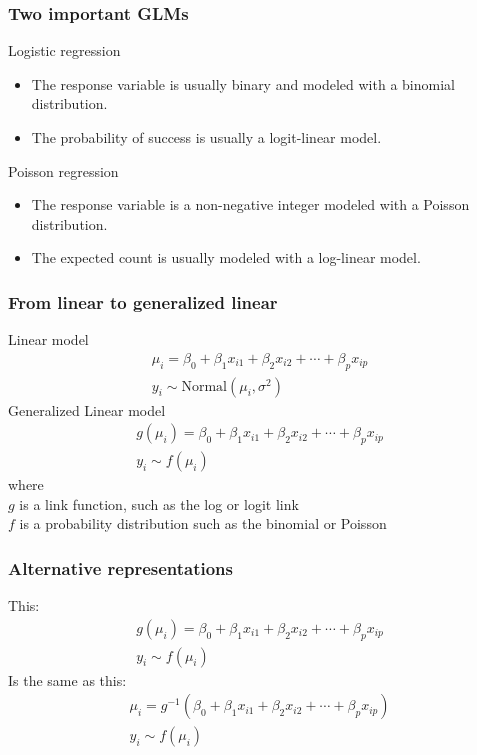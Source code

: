 \documentclass[color=usenames,dvipsnames]{beamer}\usepackage[]{graphicx}\usepackage[]{color}
\begin{document}
\begin{frame}
  \frametitle{Two important GLMs}
  {Logistic regression \\}
  \begin{itemize}
    \item The response variable is usually binary and modeled with a
      binomial distribution.
    \item The probability of success is usually a logit-linear
      model.
  \end{itemize}
  \pause
  \vfill
  {Poisson regression \\}
  \begin{itemize}
    \item The response variable is a non-negative integer modeled with
      a Poisson distribution.
    \item The expected count is usually modeled with a log-linear
      model.
  \end{itemize}
  \vfill
\end{frame}



\begin{frame}
  \frametitle{From linear to generalized linear}
  {Linear model}
  \begin{gather*}
    \mu_i = \beta_0 + \beta_1 x_{i1} + \beta_2 x_{i2} + \cdots + \beta_p x_{ip} \\
    y_i \sim \mathrm{Normal}(\mu_i, \sigma^2)
  \end{gather*}
  \pause
  \vfill
  {Generalized Linear model}
  \begin{gather*}
    g(\mu_i) = \beta_0 + \beta_1 x_{i1} + \beta_2 x_{i2} + \cdots + \beta_p x_{ip} \\
    y_i \sim f(\mu_i)
  \end{gather*}
  \pause
  {where} \\
  $g$ is a link function, such as the log or logit link \\
  \pause
  $f$ is a probability distribution such as the binomial or Poisson
\end{frame}


\begin{frame}
  \frametitle{Alternative representations}
  {This:}
  \begin{gather*}
    g(\mu_i) = \beta_0 + \beta_1 x_{i1} + \beta_2 x_{i2} + \cdots + \beta_p x_{ip} \\
    y_i \sim f(\mu_i)
  \end{gather*}
  \pause
  {Is the same as this:}
  \begin{gather*}
    \mu_i = g^{-1}(\beta_0 + \beta_1 x_{i1} + \beta_2 x_{i2} + \cdots + \beta_p x_{ip}) \\
    y_i \sim f(\mu_i)
  \end{gather*}
\end{frame}
\end{document}
